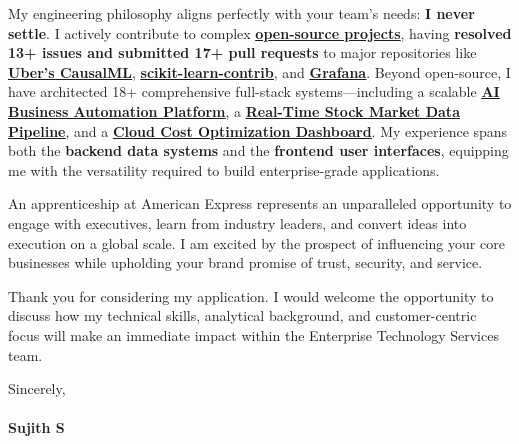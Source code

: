 \documentclass[a4paper,11pt]{article}
\newcommand{\ulink}[2]{\href{#1}{\uline{#2}}}
\begin{document}
My engineering philosophy aligns perfectly with your team's needs: \textbf{I never settle}. I actively contribute to complex \ulink{https://github.com/su-jin1425/My-Open-Source-Contributions}{\textbf{open-source projects}}, having \textbf{resolved 13+ issues and submitted 17+ pull requests} to major repositories like \ulink{https://github.com/uber/causalml}{\textbf{Uber's CausalML}}, \ulink{https://github.com/scikit-learn-contrib/forest-confidence-interval}{\textbf{scikit-learn-contrib}}, and \ulink{https://github.com/grafana/alloy-scenarios}{\textbf{Grafana}}. Beyond open-source, I have architected 18+ comprehensive full-stack systems---including a scalable \ulink{https://github.com/su-jin1425/Multi-Agent-Business-Automation}{\textbf{AI Business Automation Platform}}, a \ulink{https://github.com/su-jin1425/Real-Time-Stock-Market-Data-Pipeline}{\textbf{Real-Time Stock Market Data Pipeline}}, and a \ulink{https://github.com/su-jin1425/Cloud-Cost-Optimization-Dashboard}{\textbf{Cloud Cost Optimization Dashboard}}. My experience spans both the \textbf{backend data systems} and the \textbf{frontend user interfaces}, equipping me with the versatility required to build enterprise-grade applications.

An apprenticeship at American Express represents an unparalleled opportunity to engage with executives, learn from industry leaders, and convert ideas into execution on a global scale. I am excited by the prospect of influencing your core businesses while upholding your brand promise of trust, security, and service. 

Thank you for considering my application. I would welcome the opportunity to discuss how my technical skills, analytical background, and customer-centric focus will make an immediate impact within the Enterprise Technology Services team.

Sincerely, \\
\vspace{5pt} \\
\textbf{Sujith S}
\end{document}
